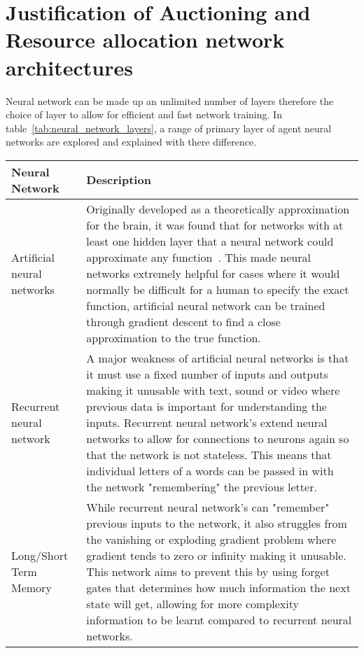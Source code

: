 \section{Justification of Auctioning and Resource allocation network architectures}\label{sec:justification-of-auctioning-and-resource-allocation-network-architectures}
Neural network can be made up an unlimited number of layers therefore the choice of layer to allow for efficient and
fast network training. In table~\ref{tab:neural_network_layers}, a range of primary layer of agent neural networks
are explored and explained with there difference.

\begin{longtable}{|p{3.5cm}|p{11cm}|} \hline
    \textbf{Neural Network} & \textbf{Description} \\ \hline
    Artificial neural networks~\citep{ANN} & Originally developed as a theoretically approximation for the brain, it
        was found that for networks with at least one hidden layer that a neural network could approximate any
        function~\citep{csaji2001approximation}. This made neural networks extremely helpful for cases where it would
        normally be difficult for a human to specify the exact function, artificial neural network can be trained
        through gradient descent to find a close approximation to the true function. \\ \hline

    Recurrent neural network~\citep{RNN} & A major weakness of artificial neural networks is that it must use a fixed
        number of inputs and outputs making it unusable with text, sound or video where previous data is important
        for understanding the inputs. Recurrent neural network's extend neural networks to allow for connections to
        neurons again so that the network is not stateless. This means that individual letters of a words can be
        passed in with the network "remembering" the previous letter. \\ \hline

    Long/Short Term Memory~\cite{LSTM} & While recurrent neural network's can "remember" previous inputs to the
        network, it also struggles from the vanishing or exploding gradient problem where gradient tends to zero or
        infinity making it unusable. This network aims to prevent this by using forget gates that determines how much
        information the next state will get, allowing for more complexity information to be learnt compared to
        recurrent neural networks. \\ \hline


\end{longtable}
